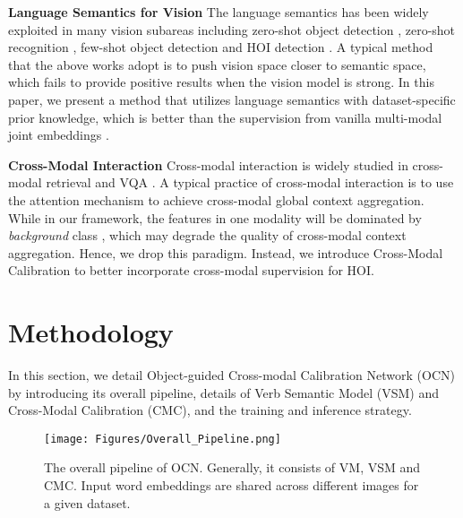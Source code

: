 \documentclass[letterpaper]{article} \usepackage{aaai22}  \usepackage{times}  \usepackage{helvet}  \usepackage{courier}  \usepackage[hyphens]{url}  \usepackage{graphicx} \urlstyle{rm} \def\UrlFont{\rm}  \usepackage{natbib}  \usepackage{caption} \DeclareCaptionStyle{ruled}{labelfont=normalfont,labelsep=colon,strut=off} \frenchspacing  \setlength{\pdfpagewidth}{8.5in}  \setlength{\pdfpageheight}{11in}  \usepackage{algorithm}
\begin{document}
\noindent\textbf{Language Semantics for Vision} The language semantics has been widely exploited in many vision subareas including zero-shot object detection \cite{bansal2018ZSOD}, zero-shot recognition \cite{wang2018ZSRsemantic}, few-shot object detection \cite{zhu2021semanticrelation} and HOI detection \cite{peyre2019HOIwithanalogy,xu2019HOIwithknowledge}. A typical method that the above works adopt is to push vision space closer to semantic space, which fails to provide positive results when the vision model is strong. In this paper, we present a method that utilizes language semantics with dataset-specific prior knowledge, which is better than the supervision from vanilla multi-modal joint embeddings \cite{xu2019HOIwithknowledge}. 




\noindent\textbf{Cross-Modal Interaction} Cross-modal interaction is widely studied in cross-modal retrieval \cite{wang2019camp,liu2019referring_grounding} and VQA \cite{Gao2019DynamicInterIntra,jiang2020videoQA}. A typical practice of cross-modal interaction is to use the attention mechanism \cite{AttentionAlluNeed} to achieve cross-modal global context aggregation. While in our framework, the features in one modality will be dominated by \textit{background} class \cite{carion2020DETR}, which may degrade the quality of cross-modal context aggregation. Hence, we drop this paradigm. Instead, we introduce Cross-Modal Calibration to better incorporate cross-modal supervision for HOI. 




\section{Methodology}
In this section, we detail Object-guided Cross-modal Calibration Network (OCN) by introducing its overall pipeline, details of Verb Semantic Model (VSM) and Cross-Modal Calibration (CMC), and the training and inference strategy.


\begin{figure*}[t]
\centering
\texttt{[image: Figures/Overall\_Pipeline.png]} 
\caption{The overall pipeline of OCN. Generally, it consists of VM, VSM and CMC. Input word embeddings are shared across different images for a given dataset.}
\label{Overall_pipeline}
\end{figure*}
\end{document}
